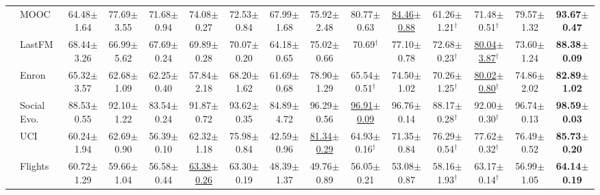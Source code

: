 \begin{table}[t]
{\begin{tabular}{llccccccccccccc}
 & MOOC & 64.48{\scriptsize$\pm$1.64} & 77.69{\scriptsize$\pm$3.55} & 71.68{\scriptsize$\pm$0.94} & 74.08{\scriptsize$\pm$0.27} & 72.53{\scriptsize$\pm$0.84} & 67.99{\scriptsize$\pm$1.68} & 75.92{\scriptsize$\pm$2.48} & 80.77{\scriptsize$\pm$0.63} & \underline{84.46{\scriptsize$\pm$0.88}} & 61.26{\scriptsize$\pm$1.21}$^\dagger$ & 71.48{\scriptsize$\pm$0.51}$^\dagger$ & 79.57{\scriptsize$\pm$1.32} & \textbf{93.67{\scriptsize$\pm$0.47}} \\
 & LastFM & 68.44{\scriptsize$\pm$3.26} & 66.99{\scriptsize$\pm$5.62} & 67.69{\scriptsize$\pm$0.24} & 69.89{\scriptsize$\pm$0.28} & 70.07{\scriptsize$\pm$0.20} & 64.18{\scriptsize$\pm$0.65} & 75.02{\scriptsize$\pm$0.66} & 70.69$^\dagger$ & 77.10{\scriptsize$\pm$0.78} & 72.68{\scriptsize$\pm$0.23}$^\dagger$ & \underline{80.04{\scriptsize$\pm$3.87}}$^\dagger$ & 73.60{\scriptsize$\pm$1.24} & \textbf{88.38{\scriptsize$\pm$0.09}} \\
 & Enron & 65.32{\scriptsize$\pm$3.57} & 62.68{\scriptsize$\pm$1.09} & 62.25{\scriptsize$\pm$0.40} & 57.84{\scriptsize$\pm$2.18} & 68.20{\scriptsize$\pm$1.62} & 61.69{\scriptsize$\pm$0.68} & 78.90{\scriptsize$\pm$1.29} & 65.54{\scriptsize$\pm$0.51}$^\dagger$ & 74.50{\scriptsize$\pm$1.02} & 70.26{\scriptsize$\pm$1.25}$^\dagger$ & \underline{80.02{\scriptsize$\pm$0.80}}$^\dagger$ & 74.86{\scriptsize$\pm$2.02} & \textbf{82.89{\scriptsize$\pm$1.02}} \\
 & Social Evo. & 88.53{\scriptsize$\pm$0.55} & 92.10{\scriptsize$\pm$1.22} & 83.54{\scriptsize$\pm$0.24} & 91.87{\scriptsize$\pm$0.72} & 93.62{\scriptsize$\pm$0.35} & 84.89{\scriptsize$\pm$4.72} & 96.29{\scriptsize$\pm$0.56} & \underline{96.91{\scriptsize$\pm$0.09}} & 96.76{\scriptsize$\pm$0.14} & 88.17{\scriptsize$\pm$0.28}$^\dagger$ & 92.00{\scriptsize$\pm$0.30}$^\dagger$ & 96.74{\scriptsize$\pm$0.13} & \textbf{98.59{\scriptsize$\pm$0.03}} \\
 & UCI & 60.24{\scriptsize$\pm$1.94} & 62.69{\scriptsize$\pm$0.90} & 56.39{\scriptsize$\pm$0.10} & 62.32{\scriptsize$\pm$1.18} & 75.98{\scriptsize$\pm$0.84} & 42.59{\scriptsize$\pm$0.96} & \underline{81.34{\scriptsize$\pm$0.29}} & 64.93{\scriptsize$\pm$0.16}$^\dagger$ & 71.35{\scriptsize$\pm$0.84} & 76.29{\scriptsize$\pm$0.54}$^\dagger$ & 77.62{\scriptsize$\pm$0.32}$^\dagger$ & 76.49{\scriptsize$\pm$0.52} & \textbf{85.73{\scriptsize$\pm$0.20}} \\
 & Flights & 60.72{\scriptsize$\pm$1.29} & 59.66{\scriptsize$\pm$1.04} & 56.58{\scriptsize$\pm$0.44} & \underline{63.38{\scriptsize$\pm$0.26}} & 63.30{\scriptsize$\pm$0.19} & 48.39{\scriptsize$\pm$1.37} & 49.76{\scriptsize$\pm$0.89} & 56.05{\scriptsize$\pm$0.21} & 53.08{\scriptsize$\pm$0.87} & 58.16{\scriptsize$\pm$1.93}$^\dagger$ & 63.17{\scriptsize$\pm$0.14}$^\dagger$ & 56.99{\scriptsize$\pm$1.05} & \textbf{64.14{\scriptsize$\pm$0.19}} \\

\end{tabular}}
\end{table}
